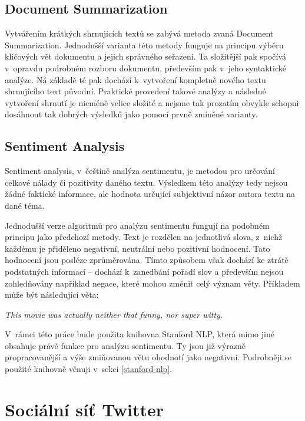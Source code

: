 \documentclass[thesis=B,czech]{FITthesis}[2012/06/26]
\begin{document}
\subsection{Document Summarization}
	Vytvářením krátkých shrnujících textů se zabývá metoda zvaná Document Summarization. Jednodušší varianta této metody funguje na principu výběru klíčových vět dokumentu a jejich správného seřazení. Ta složitější pak spočívá v~opravdu podrobném rozboru dokumentu, především pak v~jeho syntaktické analýze. Ná základě té pak dochází k~vytvoření kompletně nového textu shrnujícího text původní. Praktické provedení takové analýzy a následné vytvoření shrnutí je nicméně velice složité a nejsme tak prozatím obvykle schopni dosáhnout tak dobrých výsledků jako pomocí prvně zmíněné varianty\cite{summarization-quora}. 


\subsection{Sentiment Analysis}
\label{sentiment-analysis}
	Sentiment analysis, v~češtině analýza sentimentu, je metodou pro určování celkové nálady či pozitivity daného textu. Výsledkem této analýzy tedy nejsou žádné faktické informace, ale hodnota určující subjektivní názor autora textu na dané téma. 
	
	Jednodušší verze algoritmů pro analýzu sentimentu fungují na podobném principu jako předchozí metody. Text je rozdělen na jednotlivá slova, z~nichž každému je přiděleno negativní, neutrální nebo pozitivní hodnocení. Tato hodnocení jsou posléze zprůměrována. Tímto způsobem však dochází ke ztrátě podstatných informací -- dochází k~zanedbání pořadí slov a především nejsou zohledňovány například negace, které mohou změnit celý význam věty. Příkladem může být následující věta:

\vspace{\baselineskip}
\textit{This movie was actually neither that funny, nor super witty.}	
\vspace{\baselineskip}

	V~rámci této práce bude použita knihovna Stanford NLP\cite{stanford-nlp-web}, která mimo jiné obsahuje právě funkce pro analýzu sentimentu. Ty jsou již výrazně propracovanější a výše zmiňovanou větu ohodnotí jako negativní. Podrobněji se použité knihovně věnuji v~sekci \ref{stanford-nlp}.


\section{Sociální síť Twitter}
\label{twitter}
	
\end{document}
